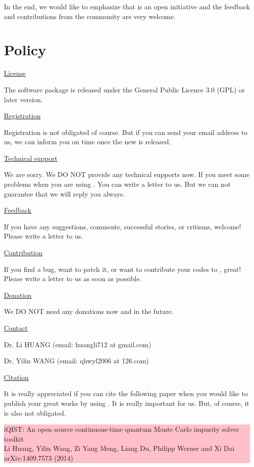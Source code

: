 In the end, we would like to emphasize that {\iqist} is an open initiative and the feedback and contributions from the community are very welcome.

\section{Policy}

\underline{License}

The {\iqist} software package is released under the General Public Licence 3.0 (GPL) or later version.

\underline{Registration}

Registration is not obligated of course. But if you can send your email address to us, we can inform you on time once the new {\iqist} is released.

\underline{Technical support}

We are sorry. We DO NOT provide any technical supports now. If you meet some problems when you are using {\iqist}. You can write a letter to us. But we can not guarantee that we will reply you always.

\underline{Feedback}

If you have any suggestions, comments, successful stories, or critisms, welcome! Please write a letter to us.

\underline{Contribution}

If you find a bug, want to patch it, or want to contribute your codes to {\iqist}, great! Please write a letter to us as soon as possible.

\underline{Donation}

We DO NOT need any donations now and in the future.

\underline{Contact}

Dr. Li HUANG (email: huangli712 at gmail.com)

Dr. Yilin WANG (email: qhwyl2006 at 126.com)

\underline{Citation}

It is really appreciated if you can cite the following paper when you would like to publish your great works by using {\iqist}. It is really important for us. But, of course, it is also not obligated.

\noindent\colorbox{pink}{\parbox[r]{\linewidth} {
iQIST: An open source continuous-time quantum Monte Carlo impurity solver toolkit \\
Li Huang, Yilin Wang, Zi Yang Meng, Liang Du, Philipp Werner and Xi Dai \\
arXiv:1409.7573 (2014)}}
